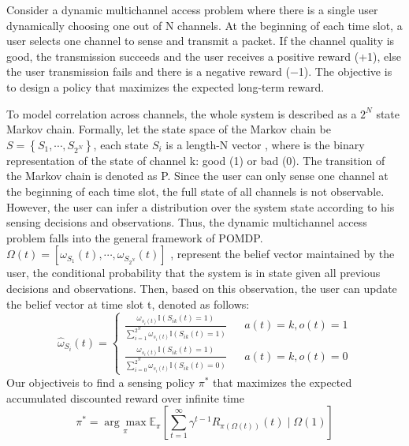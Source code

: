 Consider a dynamic multichannel access problem where there is a single user dynamically choosing one out of N channels. At the beginning of each time slot, a user selects one channel to sense and transmit a packet. If the channel quality is good, the transmission succeeds and the user receives a positive reward (+1), else the user transmission fails and there is a negative reward (−1). The objective is to design a policy that maximizes the expected long-term reward. 

To model correlation across channels, the whole system is described as a $2^{N}$ state Markov chain. Formally, let the state space of the Markov chain be $S=\left\{S_{1},\cdots,S_{2^{N}}\right\}$, each state $S_{i}$  is a length-N vector , where is the binary representation of the state of channel k: good (1) or bad (0). 
The transition of the Markov chain is denoted as P. Since the user can only sense one channel at the beginning of each time slot, the full state of all channels is not observable. However, the user can infer a distribution over the system state according to his sensing decisions and observations. Thus, the dynamic multichannel access problem falls into the general framework of POMDP.$\Omega \left ( t \right )=\left [ \omega _{S_{1}} \left ( t \right ),\cdots,\omega _{S_{2^{N}}} \left ( t \right )\right ]$ , represent the belief vector maintained by the user, the conditional probability that the system is in state given all previous decisions and observations.
Then, based on this observation, the user can update the belief vector at time slot t, denoted as follows:
\begin{equation}\tag*{1}
\hat{\omega }_{S_{i}}\left ( t \right )=\left\{
\begin{aligned}
\frac{\omega _{s_{i}\left ( t \right )}\mathbb{I}\left ( S_{ik}\left ( t \right ) =1\right )}{\sum_{i=1}^{2^{N}}\omega _{s_{i}\left ( t \right )}\mathbb{I}\left ( S_{ik}\left ( t \right ) =1\right )}& & a(t)=k,o(t)=1\\
\frac{\omega _{s_{i}\left ( t \right )}\mathbb{I}\left ( S_{ik}\left ( t \right ) =1\right )}{\sum_{i=0}^{2^{N}}\omega _{s_{i}\left ( t \right )}\mathbb{I}\left ( S_{ik}\left ( t \right ) =0\right )}& & a(t)=k,o(t)=0
\end{aligned}
\right.
\end{equation}
Our objectiveis to ﬁnd a sensing policy $\pi^{*}$ that maximizes the expected accumulated discounted reward over inﬁnite time 
\begin{equation}\tag*{2}
\pi ^{*}= \underset{\pi }{\arg \max}\mathbb{E}_{\pi}\left [ \sum_{t=1}^{\infty }\gamma ^{t-1} R_{\pi\left ( \Omega \left ( t \right ) \right )}\left ( t \right )\mid \Omega \left ( 1 \right )\right ]
\end{equation}


